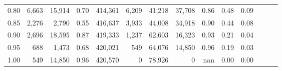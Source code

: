 \begin{tabular}{rrrrrrrrrrrrrr}
0.80 &   6,663 &  15,914 &  0.70 &  414,361 &    6,209 &  41,218 &  37,708 &  0.86 &  0.48 &      0.09 \\
0.85 &   2,276 &   2,790 &  0.55 &  416,637 &    3,933 &  44,008 &  34,918 &  0.90 &  0.44 &      0.08 \\
0.90 &   2,696 &  18,595 &  0.87 &  419,333 &    1,237 &  62,603 &  16,323 &  0.93 &  0.21 &      0.04 \\
0.95 &     688 &   1,473 &  0.68 &  420,021 &      549 &  64,076 &  14,850 &  0.96 &  0.19 &      0.03 \\
1.00 &     549 &  14,850 &  0.96 &  420,570 &        0 &  78,926 &       0 &   nan &  0.00 &      0.00 \\
\bottomrule
\end{tabular}
